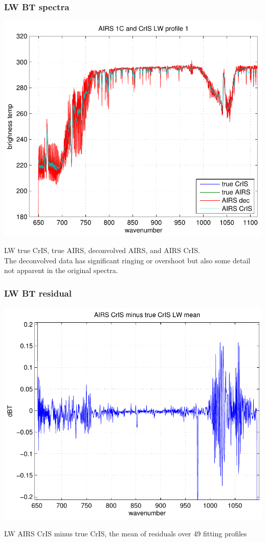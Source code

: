 \documentclass[11pt]{beamer}
\begin{document}
\begin{frame}
\frametitle{LW BT spectra}

\begin{center}
  \includegraphics[scale=0.54]{figures/fig_1_LW.pdf}
\end{center}

LW true CrIS, true AIRS, deconvolved AIRS, and AIRS CrIS.  \\
The deconvolved data has significant ringing or overshoot but also
some detail not apparent in the original spectra.

\end{frame}
\begin{frame}
\frametitle{LW BT residual}

\begin{center}
  \includegraphics[scale=0.54]{figures/fig_2_LW.pdf}
\end{center}

LW AIRS CrIS minus true CrIS, the mean of residuals over 49 fitting
profiles

\end{frame}
\end{document}
